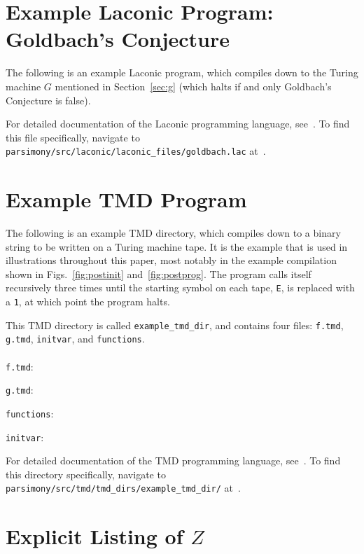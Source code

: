 \documentclass[11pt]{article}
\begin{document}
\begin{appendices}
    
\section{Example Laconic Program: Goldbach's Conjecture} \label{sec:applac}

The following is an example Laconic program, which compiles down to the Turing machine $G$ mentioned in Section~\ref{sec:g} (which halts if and only Goldbach's Conjecture is false).



For detailed documentation of the Laconic programming language, see~\cite{github}. To find this file specifically, navigate to \texttt{parsimony/src/laconic/laconic\_files/goldbach.lac} at~\cite{github}.

\section{Example TMD Program} \label{sec:apptmd}

The following is an example TMD directory, which compiles down to a binary string to be written on a Turing machine tape. It is the example that is used in illustrations throughout this paper, most notably in the example compilation shown in Figs.~\ref{fig:postinit} and~\ref{fig:postprog}. The program calls itself recursively three times until the starting symbol on each tape, \texttt{E}, is replaced with a \texttt{1}, at which point the program halts.

This TMD directory is called \texttt{example\_tmd\_dir}, and contains four files: \texttt{f.tmd}, \texttt{g.tmd}, \texttt{initvar}, and \texttt{functions}. \\ \\

\texttt{f.tmd}:

\texttt{g.tmd}:

\texttt{functions}:

\texttt{initvar}:
 

For detailed documentation of the TMD programming language, see~\cite{github}. To find this directory specifically, navigate to \texttt{parsimony/src/tmd/tmd\_dirs/example\_tmd\_dir/} at~\cite{github}.

\section{Explicit Listing of $Z$} \label{sec:explicitz}


\end{appendices}
\end{document}
